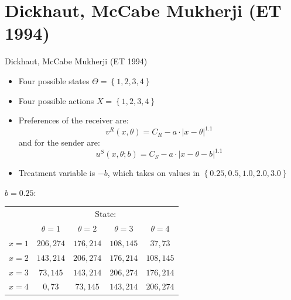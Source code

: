 \documentclass{beamer}
\begin{document}
\section{Dickhaut, McCabe Mukherji (ET 1994)}
\begin{frame}{Dickhaut, McCabe Mukherji (ET 1994)}
\begin{card}
	\begin{itemize}
		\item Four possible states $\Theta=\left\{1,2,3,4 \right\}$
		\item Four possible actions $X=\left\{1,2,3,4 \right\}$
		\item Preferences of the receiver are:
				$$v^R(x,\theta)=C_R-a\cdot \left|x-\theta\right|^{1.1}$$
				and for the sender are:
				$$u^S(x,\theta;b)=C_S-a\cdot \left|x-\theta-b\right|^{1.1}$$
		\item Treatment variable is $-b$, which takes on values in $\left\{0.25,0.5,1.0,2.0,3.0\right\}$
	\end{itemize}
	\end{card}
\end{frame}

\begin{frame}
\begin{card}[Treatment]
$b=0.25$:

    \begin{center}
	    \begin{tabular}{r|c|c|c|c|} 
			\multicolumn{1}{r}{ }& \multicolumn{4}{c}{State:}		\\
			\multicolumn{1}{r}{ }& \multicolumn{1}{c}{$\theta=1$}  & \multicolumn{1}{c}{$\theta=2$} & \multicolumn{1}{c}{$\theta=3$}& \multicolumn{1}{c}{$\theta=4$} \\ \cline{2-5}
			$x=1$ &  $206,274$ & $176,214$  & $108,145$ & $37,73$  \\ \cline{2-5}
			$x=2$ &  $143,214$ & $206,274$  & $176,214$ & $108,145$ \\ \cline{2-5}
			$x=3$ &  $73,145$  & $143,214$  & $206,274$ & $176,214$  \\ \cline{2-5}
			$x=4$ &  $0,73$    & $73,145$   & $143,214$ & $206,274$    \\ \cline{2-5}
		\end{tabular}
	\end{center}
\end{card}
\end{frame}
\end{document}
